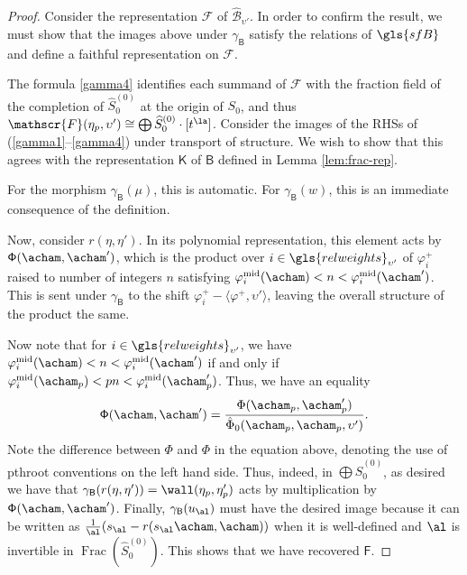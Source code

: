   
  \begin{proof}
  Consider the representation $\mathscr{F}$ of  $\widehat{\mathscr{B}}_{\upsilon'}$.  In order to confirm the result, we must show that the images above under $\gamma_{\mathsf{B}}$ satisfy the relations of $\gls{sfB}$ and define a faithful representation on $\mathscr{F}$. 
  
  The formula \ref{gamma4} identifies each summand of $\mathscr{F}$ with the fraction field of the completion of $\widehat{S}_0^{(0)}$ at the origin of $S_0$, and thus $\mathscr{F}(\eta_p,\upsilon')\cong \bigoplus \widehat{S}_0^{(0)}\cdot [t^\la]$.  Consider the images of the RHSs of (\ref{gamma1}--\ref{gamma4}) under transport of structure.  We wish to show that this agrees with the representation $\mathsf{K}$ of $\mathsf{B}$ defined in Lemma \ref{lem:frac-rep}.  
  
For the morphism $\gamma_{\mathsf{B}}(\mu)$, this is automatic.  For $\gamma_{\mathsf{B}}(w)$, this is an immediate consequence of the definition.  
  
Now, consider $r(\eta,\eta')$.  In its polynomial
representation, this element acts by
${\mathsf{\Phi}(\acham,\acham')}$, which is the product over $i\in
\gls{relweights}_{\upsilon'}$ of $\varphi_i^+$ raised to number of
integers $n$ satisfying ${\varphi}^{\operatorname{mid}}_i(\acham)< n<
{\varphi}^{\operatorname{mid}}_i(\acham')$.  This is sent under
$\gamma_{\mathsf{B}}$ to the shift $\varphi_i^+-\langle
\varphi^+,\upsilon'\rangle$, leaving the overall structure of the
product the same.  

Now note that for $i\in \gls{relweights}_{\upsilon'}$, we have ${\varphi}^{\operatorname{mid}}_i(\acham)< n< {\varphi}^{\operatorname{mid}}_i(\acham')$ if and only if $\varphi^{\operatorname{mid}}_i(\acham_p)< pn< \varphi^{\operatorname{mid}}_i(\acham'_p)$.  
Thus, we have an equality  \[{\mathsf{\Phi}(\acham,\acham')}=\frac{{\Phi}(\acham_p,\acham'_p)}{\hat{\Phi}_0(\acham_p,\acham_p,\upsilon')}.\]
Note the difference between $\mathsf{\Phi}$ and $\Phi$ in the equation above, denoting the use of \gls{pthroot} conventions on the left hand side.  Thus, indeed, in $\bigoplus \widehat{S}_0^{(0)}$, as desired we have that $\gamma_{\mathsf{B}}(r(\eta,\eta'))=\wall(\eta_p,\eta_p')$ acts by multiplication by $\mathsf{\Phi}(\acham,\acham')$.  Finally, $\gamma_{\mathsf{B}}(u_\al)$ must have the desired image because it can be written as $\frac{1}{\al}(s_{\al}-r(s_\al\acham,\acham))$ when it is well-defined and $\al$ is invertible in $\operatorname{Frac}(\widehat{S}_0^{(0)}).$  This shows that we have recovered $\mathsf{F}$.


\end{proof}
